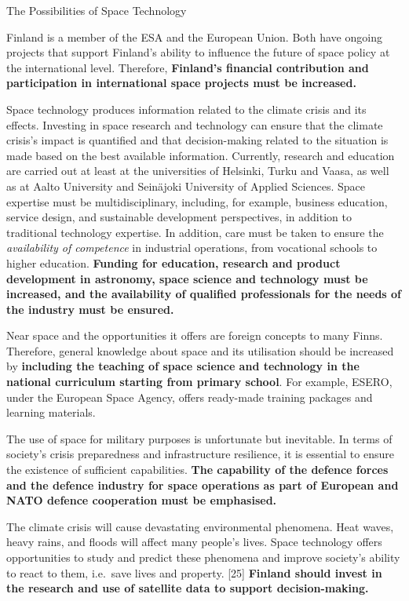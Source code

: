 \protect\hypertarget{anchor-13}{}{}The Possibilities of Space Technology

Finland is a member of the ESA and the European Union. Both have ongoing
projects that support Finland's ability to influence the future of space
policy at the international level. Therefore, \textbf{Finland's
financial contribution and participation in international space projects
must be increased.}

Space technology produces information related to the climate crisis and
its effects. Investing in space research and technology can ensure that
the climate crisis's impact is quantified and that decision-making
related to the situation is made based on the best available
information. Currently, research and education are carried out at least
at the universities of Helsinki, Turku and Vaasa, as well as at Aalto
University and Seinäjoki University of Applied Sciences. Space expertise
must be multidisciplinary, including, for example, business education,
service design, and sustainable development perspectives, in addition to
traditional technology expertise. In addition, care must be taken to
ensure the \emph{availability of competence} in industrial operations,
from vocational schools to higher education. \textbf{Funding for
education, research and product development in astronomy, space science
and technology must be increased, and the availability of qualified
professionals for the needs of the industry must be ensured.}

Near space and the opportunities it offers are foreign concepts to many
Finns. Therefore, general knowledge about space and its utilisation
should be increased by \textbf{including the teaching of space science
and technology in the national curriculum starting from primary school}.
For example, ESERO, under the European Space Agency, offers ready-made
training packages and learning materials.

The use of space for military purposes is unfortunate but inevitable. In
terms of society's crisis preparedness and infrastructure resilience, it
is essential to ensure the existence of sufficient capabilities.
\textbf{The capability of the defence forces and the defence industry
for space operations as part of European and NATO defence cooperation
must be emphasised.}

The climate crisis will cause devastating environmental phenomena. Heat
waves, heavy rains, and floods will affect many people's lives. Space
technology offers opportunities to study and predict these phenomena and
improve society's ability to react to them, i.e.~save lives and
property. {[}25{]} \textbf{Finland should invest in the research and use
of satellite data to support decision-making.}

